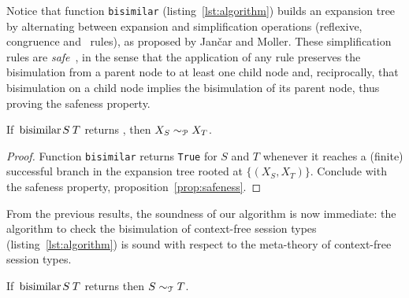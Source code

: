 Notice that function \lstinline|bisimilar|
(listing~\ref{lst:algorithm}) builds an expansion tree by alternating
between expansion and simplification operations (reflexive,
congruence and \BPA\ rules), as proposed by Jan{\v{c}}ar and Moller.
%
These simplification rules are \emph{safe}~\cite{janvcar1999techniques}, in the sense that the
application of any rule preserves the bisimulation from a parent node
to at least one child node and, reciprocally, that bisimulation on a
child node implies the bisimulation of its parent node, thus proving
the safeness property.


\begin{lemma}
  \label{lem:bisimilar-to-prod}
  If $\bisimf S T$ returns , then
  $X_{S} \sim_\mathcal P X_{T}$.
\end{lemma}

\begin{proof}
  Function \lstinline|bisimilar| returns \lstinline|True| for $S$ and
  $T$ whenever it reaches a (finite) successful branch in the expansion
  tree rooted at $\{(X_{S}, X_{T})\}$. Conclude with the safeness property,
  proposition~\ref{prop:safeness}.
\end{proof}

From the previous results, the soundness of our algorithm is now
immediate: the algorithm to check the bisimulation of context-free
session types (listing~\ref{lst:algorithm}) is sound with respect to
the meta-theory of context-free session types.

\begin{theorem}
  If $\bisimf ST$ returns  then $S\sim_\mathcal T T$.
\end{theorem}

